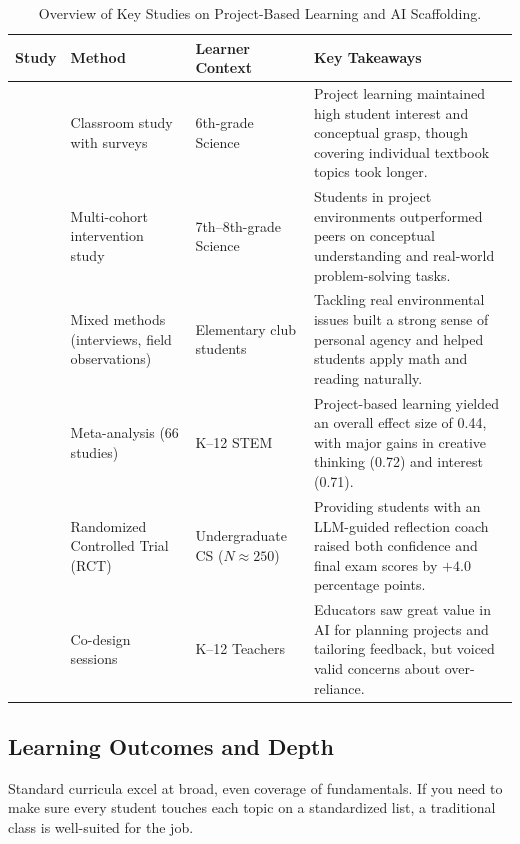 \documentclass[11pt]{article}
\begin{document}
\begin{table}[htbp]
\centering
\small
\caption{Overview of Key Studies on Project-Based Learning and AI Scaffolding.}
\label{tab:empirical_studies}
\begin{tabularx}{\linewidth}{p{2.6cm}p{2.2cm}p{2.8cm} >{\raggedright\arraybackslash}X}
\toprule
\textbf{Study} & \textbf{Method} & \textbf{Learner Context} & \textbf{Key Takeaways} \\
\midrule
\citet{blumenfeld1991} & Classroom study with surveys & 6th-grade Science & Project learning maintained high student interest and conceptual grasp, though covering individual textbook topics took longer. \\
\addlinespace
\citet{barron1998} & Multi-cohort intervention study & 7th--8th-grade Science & Students in project environments outperformed peers on conceptual understanding and real-world problem-solving tasks. \\
\addlinespace
\citet{farmer2019} & Mixed methods (interviews, field observations) & Elementary club students & Tackling real environmental issues built a strong sense of personal agency and helped students apply math and reading naturally. \\
\addlinespace
\citet{zheng2023meta} & Meta-analysis (66 studies) & K--12 STEM & Project-based learning yielded an overall effect size of 0.44, with major gains in creative thinking (0.72) and interest (0.71). \\
\addlinespace
\citet{kumar2024} & Randomized Controlled Trial (RCT) & Undergraduate CS ($N \approx 250$) & Providing students with an LLM-guided reflection coach raised both confidence and final exam scores by $+4.0$ percentage points. \\
\addlinespace
\citet{ravi2025} & Co-design sessions & K--12 Teachers & Educators saw great value in AI for planning projects and tailoring feedback, but voiced valid concerns about over-reliance. \\
\bottomrule
\end{tabularx}
\end{table}

\subsection{Learning Outcomes and Depth}
Standard curricula excel at broad, even coverage of fundamentals. If you need to make sure every student touches each topic on a standardized list, a traditional class is well-suited for the job. 
\end{document}

